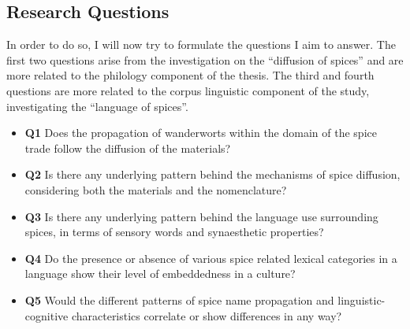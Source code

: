 \subsection{Research Questions}

In order to do so, I will now try to formulate the questions I aim to answer. The first two questions arise from the investigation on the ``diffusion of spices'' and are more related to the philology component of the thesis. The third and fourth questions are more related to the corpus linguistic component of the study, investigating the ``language of spices''. 

\begin{itemize}
    \item \textbf{Q1} Does the propagation of \glspl{wanderwort} within the domain of the spice trade follow the diffusion of the materials?

    \item \textbf{Q2} Is there any underlying pattern behind the mechanisms of spice diffusion, considering both the materials and the nomenclature?
    
    \item \textbf{Q3} Is there any underlying pattern behind the language use surrounding spices, in terms of sensory words and synaesthetic properties?
    
    \item \textbf{Q4} Do the presence or absence of various spice related lexical categories in a language show their level of embeddedness in a culture?
    
    \item \textbf{Q5} Would the different patterns of spice name propagation and linguistic-cognitive characteristics correlate or show differences in any way?

\end{itemize}



